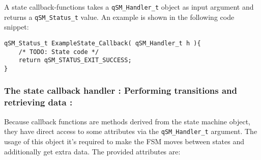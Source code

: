 A state callback-functions takes a \lstinline{qSM_Handler_t} object as input argument and returns a \lstinline{qSM_Status_t} value. An example is shown in the following code snippet:
\medskip

\begin{lstlisting}[style=CStyle]
qSM_Status_t ExampleState_Callback( qSM_Handler_t h ){
    /* TODO: State code */
    return qSM_STATUS_EXIT_SUCCESS;
}
\end{lstlisting} 


\subsubsection{The state callback handler : Performing transitions and retrieving data : }

Because callback functions are methods derived from the state machine object, they have direct access to some attributes via the \lstinline{qSM_Handler_t} argument. 
The usage of this object it's required to make the FSM moves between states and additionally get extra data. The provided attributes are:

